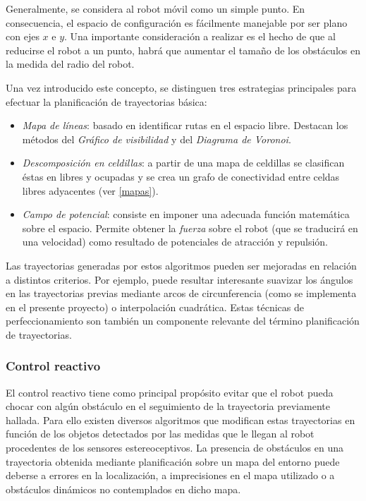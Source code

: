 Generalmente, se considera al robot móvil como un simple punto. En consecuencia, el espacio de configuración es fácilmente manejable por ser plano con ejes $x$ e $y$. Una importante consideración a realizar es el hecho de que al reducirse el robot a un punto, habrá que aumentar el tamaño de los obstáculos en la medida del radio del robot.

Una vez introducido este concepto, se distinguen tres estrategias principales para efectuar la planificación de trayectorias básica:
\begin{itemize}
  \item \emph{Mapa de líneas}: basado en identificar rutas en el espacio libre. Destacan los métodos del \emph{Gráfico de visibilidad } y del \emph{Diagrama de Voronoi}.
  \item \emph{Descomposición en celdillas}: a partir de una mapa de celdillas se clasifican éstas en libres y ocupadas y se crea un grafo de conectividad entre celdas libres adyacentes (ver \ref{mapas}).
  \item \emph{Campo de potencial}: consiste en imponer una adecuada función matemática sobre el espacio. Permite obtener la \emph{fuerza} sobre el robot (que se traducirá en una velocidad) como resultado de potenciales de atracción y repulsión.
\end{itemize}

Las trayectorias generadas por estos algoritmos pueden ser mejoradas en relación a distintos criterios. Por ejemplo, puede resultar interesante suavizar los ángulos en las trayectorias previas mediante arcos de circunferencia (como se implementa en el presente proyecto) o interpolación cuadrática. Estas técnicas de perfeccionamiento son también un componente relevante del término planificación de trayectorias.

\subsubsection{Control reactivo}
El control reactivo tiene como principal propósito evitar que el robot pueda chocar con algún obstáculo en el seguimiento de la trayectoria previamente hallada. Para ello existen diversos algoritmos que modifican estas trayectorias en función de los objetos detectados por las medidas que le llegan al robot procedentes de los sensores estereoceptivos. La presencia de obstáculos en una trayectoria obtenida mediante planificación sobre un mapa del entorno puede deberse a errores en la localización, a imprecisiones en el mapa utilizado o a obstáculos dinámicos no contemplados en dicho mapa.

